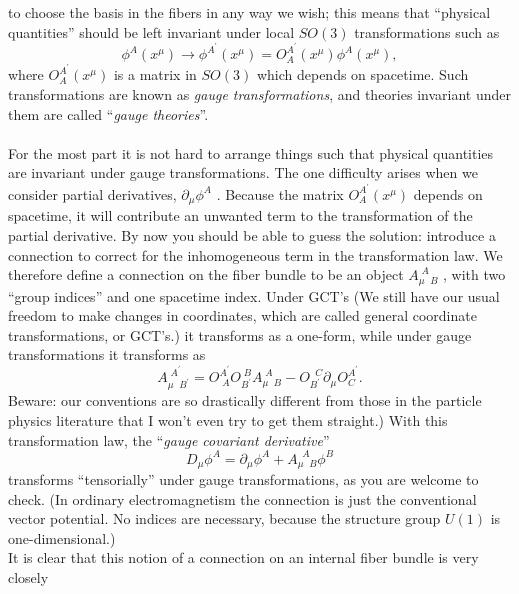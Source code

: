 to choose the basis in the fibers in any way we wish; this means that “physical quantities”
should be left invariant under local $SO(3)$ transformations such as
\begin{equation}
	\phi^A(x^{\mu}) \rightarrow \phi^{A^\prime} (x^\mu) = O^{A^\prime}_A(x^\mu) \phi^A(x^\mu),
\end{equation}
where $O^{A^\prime}_A (x^μ )$ is a matrix in $SO(3)$ which depends on spacetime. Such transformations
are known as \emph{gauge transformations}, and theories invariant under them are called “\emph{gauge
theories}”.\\
\\
For the most part it is not hard to arrange things such that physical quantities are
invariant under gauge transformations. The one difficulty arises when we consider partial
derivatives, $∂_μ \phi^A$ . Because the matrix $O^{A^\prime}_A (x^μ )$ depends on spacetime, it will contribute an
unwanted term to the transformation of the partial derivative. By now you should be able
to guess the solution: introduce a connection to correct for the inhomogeneous term in the
transformation law. We therefore define a connection on the fiber bundle to be an object
$A^{\;A}_{\mu\;\; B}$ , with two “group indices” and one spacetime index. Under GCT’s (We still have our usual
freedom to make changes in coordinates, which are called general coordinate transformations, or GCT’s.) it transforms as a
one-form, while under gauge transformations it transforms as
\begin{equation}
\label{eq:fibrebundleconnectiontrafo}
	A^{\;A^\prime}_{\mu \;\; B^\prime} =O^{A^\prime}_{\;A} O^{\;B}_{B^\prime}A^{\;A}_{\mu \;\;B}  -O^{\;\;C}_{B^\prime} \partial_{\mu} O^{A^\prime}_C.
\end{equation}
Beware: our conventions are so drastically different from those in the particle physics literature that I won’t even try to get them straight.) With this transformation law, the “\emph{gauge
covariant derivative}”
\begin{equation}
\label{eq:gaugecovderiv}
	D_\mu \phi^A = \partial_{\mu} \phi^A + A^{\;\,A}_{\mu \;\;B} \phi^B
\end{equation}
transforms “tensorially” under gauge transformations, as you are welcome to check. (In
ordinary electromagnetism the connection is just the conventional vector potential. No
indices are necessary, because the structure group $U(1)$ is one-dimensional.)
\\
It is clear that this notion of a connection on an internal fiber bundle is very closely
